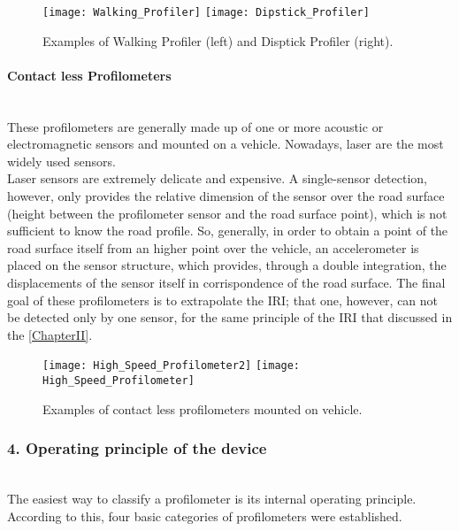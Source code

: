 \documentclass[tesi]{subfiles}
\begin{document}
\vspace{0.35cm}
\begin{figure}[ht]
\centering
\texttt{[image: Walking\_Profiler]}
\hspace{1.5cm}
\texttt{[image: Dipstick\_Profiler]}
\caption{Examples of Walking Profiler (left) and Disptick Profiler (right).}
\label{fig:contact_profiler}
\end{figure}
\clearpage
\paragraph{Contact less Profilometers}\leavevmode\\  \noindent These profilometers are generally made up of one or more acoustic or electromagnetic sensors and mounted on a vehicle. Nowadays, laser are the most widely used sensors.\\ Laser sensors are extremely delicate and expensive. A single-sensor detection, however, only provides the relative dimension of the sensor over the road surface (height between the profilometer sensor and the road surface point), which is not sufficient to know the road profile. So, generally, in order to obtain a point of the road surface itself from an higher point over the vehicle, an accelerometer is placed on the sensor structure, which provides, through a double integration, the displacements of the sensor itself in corrispondence of the road surface. The final goal of these profilometers is to extrapolate the IRI; that one, however, can not be detected only by one sensor, for the same principle of the IRI that discussed in the \ref{ChapterII}.

\vspace{0.35cm}
\begin{figure}[ht]
\centering
\texttt{[image: High\_Speed\_Profilometer2]}
\hspace{1cm}
\texttt{[image: High\_Speed\_Profilometer]}
\caption{Examples of contact less profilometers mounted on vehicle.}
\label{fig:contact_less_profiler}
\end{figure}



\subsubsection{4. Operating principle of the device}\leavevmode\\
The easiest way to classify a profilometer is its internal operating principle.\\ According to this, four basic categories of profilometers were established\cite{measuring_equipment}.
\end{document}
